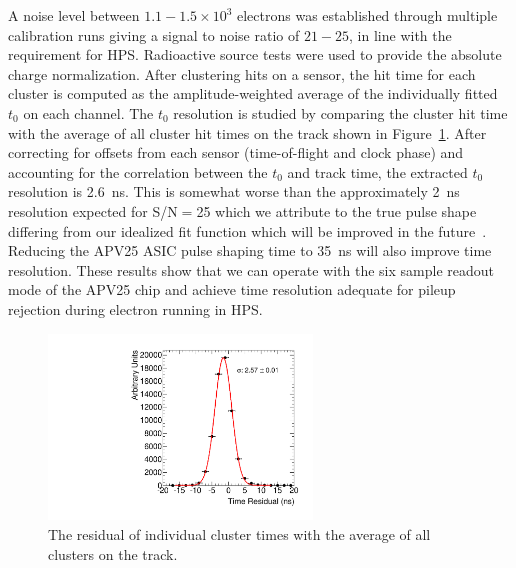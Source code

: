 \documentclass[final,3p,times,twocolumn]{elsarticle}
\begin{document}
A noise level between $1.1-1.5\times 10^{3}$ electrons was established through multiple calibration 
runs giving a signal to noise ratio of $21-25$, in line with the requirement for HPS. 
Radioactive source tests were used to 
provide the absolute charge normalization.
After clustering hits on a sensor, the hit time for each cluster is computed 
as the amplitude-weighted average of the individually fitted $t_0$ on each channel. The 
$t_0$ resolution is studied by comparing the cluster hit time with the average of all cluster hit times on 
the track shown in Figure~\ref{fig:tracktime}. 
After correcting for offsets from each sensor (time-of-flight and clock phase) and accounting for the 
correlation between the $t_0$ and track time,  the extracted $t_0$ resolution is 2.6~ns. This is 
somewhat worse than the approximately 2~ns resolution expected for S/N$=$25 which we attribute to the 
true pulse shape differing from our idealized fit function which will be improved in the 
future~\cite{Friedl2007385}. Reducing 
the APV25 ASIC pulse shaping time to 35~ns will also improve time resolution. 
These results show that we can operate with the six sample readout mode of the APV25 chip and 
achieve time resolution adequate for pileup rejection during electron running in HPS. 
\begin{figure}[]
\begin{center}
\includegraphics[width=7cm]{run1351_time_residual_top_layer2.pdf}
\caption{\small The residual of individual cluster times with the average of all clusters on the track. 
\label{fig:tracktime}}
\end{center}
\end{figure}
\end{document}
